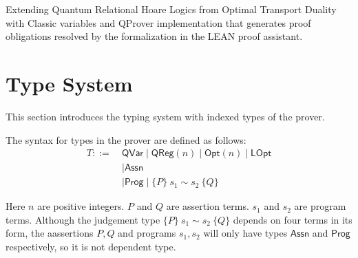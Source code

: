 
Extending Quantum Relational Hoare Logics from Optimal Transport Duality with Classic variables and QProver implementation that generates proof obligations resolved by the formalization in the LEAN proof assistant.



\section{Type System}
This section introduces the typing system with indexed types of the prover.

\newcommand{\qvar}{\textsf{QVar}}
\newcommand{\qreg}[1]{\ensuremath{\textsf{QReg}(#1)}}
\newcommand{\opt}[1]{\ensuremath{\textsf{Opt}(#1)}}
\newcommand{\lopt}{\ensuremath{\textsf{LOpt}}}
\newcommand{\unitary}[1]{\ensuremath{\textsf{Unitary}({#1})}}
\newcommand{\assn}{\ensuremath{\textsf{Assn}}}
\newcommand{\prog}{\ensuremath{\textsf{Prog}}}
\newcommand{\judge}[4]{\ensuremath{\{#1\}~#2 \sim #3~\{#4\}}}

\begin{definition}
    \label{def:type syntax}
    The syntax for types in the prover are defined as follows:
    \begin{align*}
        T ::=\ & \qvar \mid \qreg{n} \mid \opt{n} \mid \lopt \\
            & \mid \assn\\
            & \mid \prog \mid \judge{P}{s_1}{s_2}{Q}
    \end{align*}
\end{definition}
Here $n$ are positive integers. $P$ and $Q$ are assertion terms. $s_1$ and $s_2$ are program terms.
Although the judgement type \judge{P}{s_1}{s_2}{Q} depends on four terms in its form, the aassertions $P, Q$ and programs $s_1, s_2$ will only have types $\assn$ and $\prog$ respectively, so it is not dependent type.

\newcommand{\assert}[1]{\ensuremath{\textsf{assert}(#1)}}
\newcommand{\pf}{\textsf{proof}}

